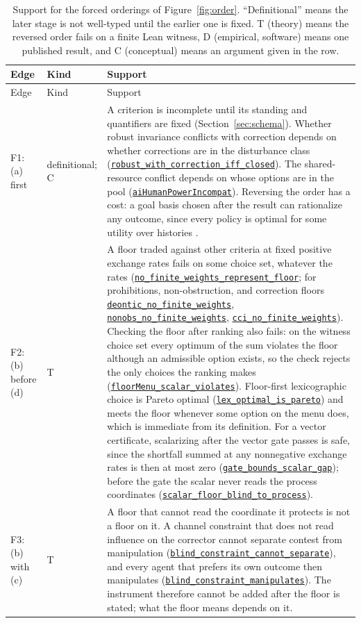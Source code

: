 \documentclass[11pt]{article}
\newcommand{\lean}[1]{\hyperref[lean:#1]{\nolinkurl{#1}}}
\begin{document}
{\footnotesize
\setlength{\tabcolsep}{3pt}
\begin{xltabular}{\textwidth}{@{}L{1.2cm} L{1.6cm} Y@{}}
\caption{Support for the forced orderings of Figure~\ref{fig:order}. ``Definitional'' means the later stage is not well-typed until the earlier one is fixed. T (theory) means the reversed order fails on a finite Lean witness, D (empirical, software) means one published result, and C (conceptual) means an argument given in the row.}\label{tab:order}\\
\toprule
Edge & Kind & Support \\
\midrule
\endfirsthead
\toprule
Edge & Kind & Support \\
\midrule
\endhead
\bottomrule
\endfoot
F1: (a) first & definitional; C & A criterion is incomplete until its standing and quantifiers are fixed (Section~\ref{sec:schema}). Whether robust invariance conflicts with correction depends on whether corrections are in the disturbance class (\lean{robust_with_correction_iff_closed}). The shared-resource conflict depends on whose options are in the pool (\lean{aiHumanPowerIncompat}). Reversing the order has a cost: a goal basis chosen after the result can rationalize any outcome, since every policy is optimal for some utility over histories \parencite{shah2018coherence}. \\
F2: (b) before (d) & T & A floor traded against other criteria at fixed positive exchange rates fails on some choice set, whatever the rates (\lean{no_finite_weights_represent_floor}; for prohibitions, non-obstruction, and correction floors \lean{deontic_no_finite_weights}, \lean{nonobs_no_finite_weights}, \lean{cci_no_finite_weights}). Checking the floor after ranking also fails: on the witness choice set every optimum of the sum violates the floor although an admissible option exists, so the check rejects the only choices the ranking makes (\lean{floorMenu_scalar_violates}). Floor-first lexicographic choice is Pareto optimal (\lean{lex_optimal_is_pareto}) and meets the floor whenever some option on the menu does, which is immediate from its definition. For a vector certificate, scalarizing after the vector gate passes is safe, since the shortfall summed at any nonnegative exchange rates is then at most zero (\lean{gate_bounds_scalar_gap}); before the gate the scalar never reads the process coordinates (\lean{scalar_floor_blind_to_process}). \\
F3: (b) with (c) & T & A floor that cannot read the coordinate it protects is not a floor on it. A channel constraint that does not read influence on the corrector cannot separate contest from manipulation (\lean{blind_constraint_cannot_separate}), and every agent that prefers its own outcome then manipulates (\lean{blind_constraint_manipulates}). The instrument therefore cannot be added after the floor is stated; what the floor means depends on it. \\

\end{xltabular}}
\end{document}
